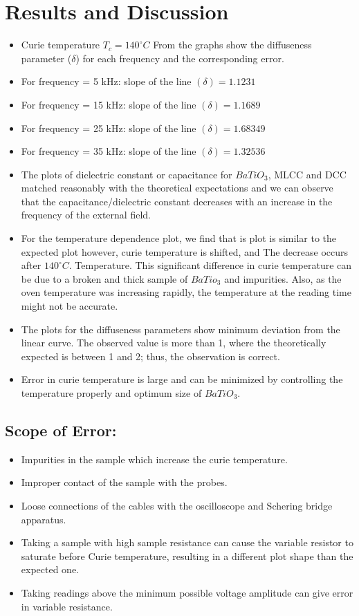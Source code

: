 \section{Results and Discussion}
    \begin{itemize}
        \item Curie temperature $T_c = 140^\circ C$ From the graphs show the diffuseness parameter ($\delta$) for each frequency and the corresponding error.
        \item For frequency = 5 kHz: slope of the line $(\delta) = 1.1231$
        \item For frequency = 15 kHz: slope of the line $(\delta) = 1.1689$
        \item For frequency = 25 kHz: slope of the line $(\delta) = 1.68349$
        \item For frequency = 35 kHz: slope of the line $(\delta) = 1.32536$
        \item The plots of dielectric constant or capacitance for $BaTiO_3$, MLCC and DCC matched reasonably with the theoretical expectations and we can observe that the capacitance/dielectric constant decreases with an increase in the frequency of the external field.
        \item For the temperature dependence plot, we find that is plot is similar to the expected plot however, curie temperature is shifted, and  The decrease occurs after $140^\circ C$. Temperature. This significant difference in curie temperature can be due to a broken and thick sample of $BaTio_3$ and impurities. Also, as the oven temperature was increasing rapidly, the temperature at the reading time might not be accurate.
        \item The plots for the diffuseness parameters show minimum deviation from  the linear curve. The observed value is more than 1, where the theoretically expected is between 1 and 2; thus, the observation is correct.
        \item Error in curie temperature is large and can be minimized by controlling the temperature properly and optimum size of $BaTiO_3$.
    \end{itemize}
 
    \subsection{Scope of Error:}
        \begin{itemize}
            \item Impurities in the sample which increase the curie temperature.
            \item Improper contact of the sample with the probes.
            \item Loose connections of the cables with the oscilloscope and Schering bridge apparatus.
            \item Taking a sample with high sample resistance can cause the variable resistor to saturate before Curie temperature, resulting in a different plot shape than the expected one.
            \item Taking readings above the minimum possible voltage amplitude can give error in variable resistance.
        \end{itemize}
 
 